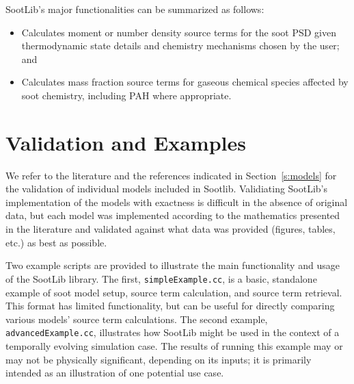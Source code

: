 \documentclass[preprint,letterpaper]{elsarticle}
\begin{document}
SootLib's major functionalities can be summarized as follows:
\begin{itemize}
    \item Calculates moment or number density source terms for the soot PSD given thermodynamic state details and chemistry mechanisms chosen by the user; and
    \item Calculates mass fraction source terms for gaseous chemical species affected by soot chemistry, including PAH where appropriate.
\end{itemize}


\section{Validation and Examples}
\label{s:examples}

We refer to the literature and the references indicated in Section~\ref{s:models} for the validation of individual models included in Sootlib. Validiating SootLib's implementation of the models with exactness is difficult in the absence of original data, but each model was implemented according to the mathematics presented in the literature and validated against what data was provided (figures, tables, etc.) as best as possible.

Two example scripts are provided to illustrate the main functionality and usage of the SootLib library. The first, \texttt{simpleExample.cc}, is a basic, standalone example of soot model setup, source term calculation, and source term retrieval. This format has limited functionality, but can be useful for directly comparing various models' source term calculations. The second example, \texttt{advancedExample.cc}, illustrates how SootLib might be used in the context of a temporally evolving simulation case. The results of running this example may or may not be physically significant, depending on its inputs; it is primarily intended as an illustration of one potential use case.
\end{document}
